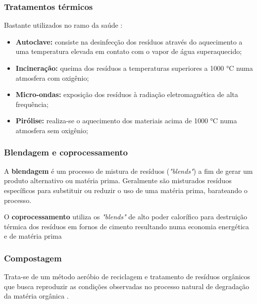\subsubsection{Tratamentos térmicos}
Bastante utilizados no ramo da saúde \cite{diagnostico_cristine}:
\begin{itemize} 
	\item \textbf{Autoclave:} consiste na desinfecção dos resíduos através do aquecimento a uma temperatura elevada em contato com o vapor de água superaquecido;
	\item \textbf{Incineração:} queima dos resíduos a temperaturas superiores a 1000 °C numa atmosfera com oxigênio;
	\item \textbf{Micro-ondas:} exposição dos resíduos à radiação eletromagnética de alta frequência;
	\item \textbf{Pirólise:} realiza-se o aquecimento dos materiais acima de 1000 °C numa atmosfera sem oxigênio;
\end{itemize}

\subsubsection{Blendagem e coprocessamento}

A \textbf{blendagem} é um processo de mistura de resíduos (\textit{"blends"}) a fim de gerar um produto alternativo ou matéria prima. Geralmente são misturados resíduos específicos para substituir ou reduzir o uso de uma matéria prima, barateando o processo. 

O \textbf{coprocessamento} utiliza os \textit{"blends"} de alto poder calorífico para destruição térmica dos resíduos em fornos de cimento resultando numa economia energética e de matéria prima \cite{noauthor_destinacao_nodate}


\subsubsection{Compostagem}

Trata-se de um método aeróbio de reciclagem e tratamento de resíduos orgânicos que busca reproduzir as condições observadas no processo natural de degradação da matéria orgânica \cite{diagnostico_cristine}.

